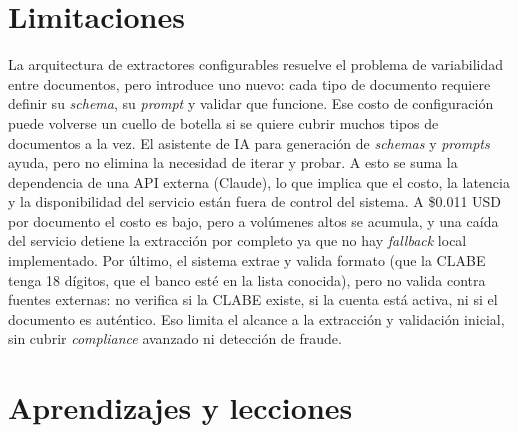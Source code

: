 \section{Limitaciones}

La arquitectura de extractores configurables resuelve el problema de variabilidad entre documentos, pero introduce uno nuevo: cada tipo de documento requiere definir su \textit{schema}, su \textit{prompt} y validar que funcione. Ese costo de configuración puede volverse un cuello de botella si se quiere cubrir muchos tipos de documentos a la vez. El asistente de IA para generación de \textit{schemas} y \textit{prompts} ayuda, pero no elimina la necesidad de iterar y probar. A esto se suma la dependencia de una API externa (Claude), lo que implica que el costo, la latencia y la disponibilidad del servicio están fuera de control del sistema. A \$0.011 USD por documento el costo es bajo, pero a volúmenes altos se acumula, y una caída del servicio detiene la extracción por completo ya que no hay \textit{fallback} local implementado. Por último, el sistema extrae y valida formato (que la CLABE tenga 18 dígitos, que el banco esté en la lista conocida), pero no valida contra fuentes externas: no verifica si la CLABE existe, si la cuenta está activa, ni si el documento es auténtico. Eso limita el alcance a la extracción y validación inicial, sin cubrir \textit{compliance} avanzado ni detección de fraude.

\section{Aprendizajes y lecciones}

